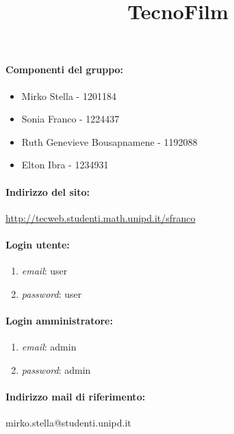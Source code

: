 \documentclass[a4paper]{article}
\title{\Huge \textbf {TecnoFilm}}
\date{}
\begin{document}
\maketitle

\vfill
\paragraph*{Componenti del gruppo:}
\begin{itemize}
    \item Mirko Stella - 1201184 
    \item Sonia Franco - 1224437
    \item Ruth Genevieve Bousapnamene - 1192088  
    \item Elton Ibra - 1234931
\end{itemize}

\paragraph*{Indirizzo del sito:}
\href{http://tecweb.studenti.math.unipd.it/sfranco}{http://tecweb.studenti.math.unipd.it/sfranco}

\paragraph*{Login utente:}
\begin{enumerate}
    \item [] \textit{email}: user 
    \item [] \textit{password}: user
\end{enumerate}
 
\paragraph*{Login amministratore:}
\begin{enumerate}
    \item [] \textit{email}: admin 
    \item [] \textit{password}: admin
\end{enumerate}

\paragraph*{Indirizzo mail di riferimento:}

mirko.stella@studenti.unipd.it

\vfill

\newpage
\end{document}
